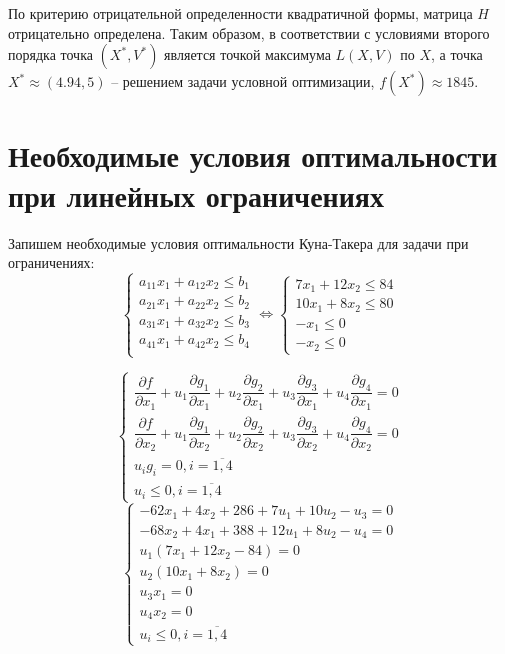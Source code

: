 По критерию отрицательной определенности квадратичной формы, матрица $H$ отрицательно определена. Таким образом, в соответствии с условиями второго порядка точка $(X^*, V^*)$ является точкой максимума $L(X, V)$ по $X$, а точка $X^* \approx (4.94, 5)$ -- решением задачи условной оптимизации, $f(X^*) \approx 1845$. 

\newpage

\section{Необходимые условия оптимальности при линейных ограничениях}

Запишем необходимые условия оптимальности Куна-Такера для задачи при ограничениях:
\begin{equation*}
\begin{cases}
	a_{11} x_1 + a_{12} x_2 \leq b_1 \\
	a_{21} x_1 + a_{22} x_2 \leq b_2 \\
	a_{31} x_1 + a_{32} x_2 \leq b_3 \\
	a_{41} x_1 + a_{42} x_2 \leq b_4 \\
\end{cases}
\Longleftrightarrow
\begin{cases}
	7 x_1 + 12 x_2 \leq 84 \\
	10 x_1 + 8 x_2 \leq 80 \\
	-x_1 \leq 0 \\
	-x_2 \leq 0
\end{cases}
\end{equation*}

\begin{equation*}
\begin{cases}
	\dfrac{\partial f}{\partial x_1} + u_1 \dfrac{\partial g_1}{\partial x_1} + u_2 \dfrac{\partial g_2}{\partial x_1} + u_3 \dfrac{\partial g_3}{\partial x_1} + u_4 \dfrac{\partial g_4}{\partial x_1} = 0 \\[0.3cm]
	\dfrac{\partial f}{\partial x_2} + u_1 \dfrac{\partial g_1}{\partial x_2} + u_2 \dfrac{\partial g_2}{\partial x_2} + u_3 \dfrac{\partial g_3}{\partial x_2} + u_4 \dfrac{\partial g_4}{\partial x_2} = 0 \\
	u_i g_i = 0, i = \overline{1,4} \\
	u_i \leq 0, i = \overline{1,4}
\end{cases}
\end{equation*}
\begin{equation*}
\begin{cases}
	-62 x_1 + 4 x_2 + 286 + 7 u_1 + 10 u_2 - u_3 = 0 \\
	-68 x_2 + 4 x_1 + 388 + 12 u_1 + 8 u_2 - u_4 = 0 \\
	u_1 (7 x_1 + 12 x_2 - 84) = 0 \\
	u_2 (10 x_1 + 8 x_2) = 0 \\
	u_3 x_1 = 0 \\
	u_4 x_2 = 0 \\
	u_i \leq 0, i = \overline{1,4}
\end{cases}
\end{equation*}


